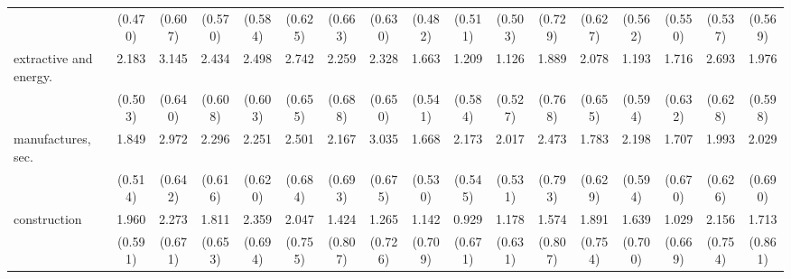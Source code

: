 {\begin{tabular}{l*{16}{c}}
                    &     (0.470)         &     (0.607)         &     (0.570)         &     (0.584)         &     (0.625)         &     (0.663)         &     (0.630)         &     (0.482)         &     (0.511)         &     (0.503)         &     (0.729)         &     (0.627)         &     (0.562)         &     (0.550)         &     (0.537)         &     (0.569)         \\
[1em]
extractive and energy.&       2.183\sym{***}&       3.145\sym{***}&       2.434\sym{***}&       2.498\sym{***}&       2.742\sym{***}&       2.259\sym{**} &       2.328\sym{***}&       1.663\sym{**} &       1.209\sym{*}  &       1.126\sym{*}  &       1.889\sym{*}  &       2.078\sym{**} &       1.193\sym{*}  &       1.716\sym{**} &       2.693\sym{***}&       1.976\sym{***}\\
                    &     (0.503)         &     (0.640)         &     (0.608)         &     (0.603)         &     (0.655)         &     (0.688)         &     (0.650)         &     (0.541)         &     (0.584)         &     (0.527)         &     (0.768)         &     (0.655)         &     (0.594)         &     (0.632)         &     (0.628)         &     (0.598)         \\
[1em]
manufactures, sec.  &       1.849\sym{***}&       2.972\sym{***}&       2.296\sym{***}&       2.251\sym{***}&       2.501\sym{***}&       2.167\sym{**} &       3.035\sym{***}&       1.668\sym{**} &       2.173\sym{***}&       2.017\sym{***}&       2.473\sym{**} &       1.783\sym{**} &       2.198\sym{***}&       1.707\sym{*}  &       1.993\sym{**} &       2.029\sym{**} \\
                    &     (0.514)         &     (0.642)         &     (0.616)         &     (0.620)         &     (0.684)         &     (0.693)         &     (0.675)         &     (0.530)         &     (0.545)         &     (0.531)         &     (0.793)         &     (0.629)         &     (0.594)         &     (0.670)         &     (0.626)         &     (0.690)         \\
[1em]
construction        &       1.960\sym{***}&       2.273\sym{***}&       1.811\sym{**} &       2.359\sym{***}&       2.047\sym{**} &       1.424         &       1.265         &       1.142         &       0.929         &       1.178         &       1.574         &       1.891\sym{*}  &       1.639\sym{*}  &       1.029         &       2.156\sym{**} &       1.713\sym{*}  \\
                    &     (0.591)         &     (0.671)         &     (0.653)         &     (0.694)         &     (0.755)         &     (0.807)         &     (0.726)         &     (0.709)         &     (0.671)         &     (0.631)         &     (0.807)         &     (0.754)         &     (0.700)         &     (0.669)         &     (0.754)         &     (0.861)         \\

\end{tabular}}
